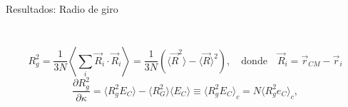 \documentclass[xcolor=dvipsnames]{beamer}
\begin{document}
\begin{frame}{Resultados: Radio de giro}
\begin{columns}
  \begin{column}{5.8cm}
    \begin{figure}[h]
      \centering
      \resizebox{\columnwidth}{!}{}
    \end{figure}
  \end{column}
  \begin{column}{5.8cm}
    \begin{figure}[h]
      \centering
     \resizebox{\columnwidth}{!}{ }
    \end{figure}
  \end{column}
\end{columns}
\begin{equation*} 
  R_g^{2}=\frac{1}{3N}\left\langle \sum_{i}
  \vec{R}_i\cdot\vec{R}_i\right\rangle=\frac{1}{3N}(\langle\vec{R}^2 \rangle
-\langle\vec{R} \rangle^2),\quad \text{donde}\quad \vec{R}_i=\vec{r}_{CM}-\vec{r}_i 
\end{equation*}
\begin{equation*}
  \frac{\partial R_g^2}{\partial \kappa}=\langle R_g^2 E_C \rangle-\langle R_G^2\rangle\langle E_C\rangle\equiv\langle R_g^2E_C \rangle_c=N\langle R_g^2e_C \rangle_c,
\end{equation*}
\end{frame}
\end{document}
